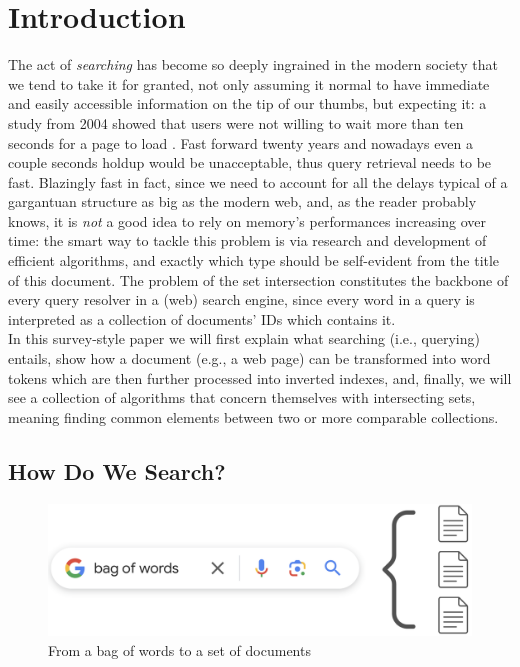 \chapter{Introduction\label{intro}}

The act of \textit{searching} has become so deeply ingrained in the modern society that we tend to take it for granted, not only assuming it normal to have immediate and easily accessible information on the tip of our thumbs, but expecting it: a study from 2004 showed that users were not willing to wait more than ten seconds for a page to load \citep{waitTime}. Fast forward twenty years and nowadays even a couple seconds holdup would be unacceptable, thus query retrieval needs to be fast. Blazingly fast in fact, since we need to account for all the delays typical of a gargantuan structure as big as the modern web, and, as the reader probably knows, it is \textit{not} a good idea to rely on memory's performances increasing over time: the smart way to tackle this problem is via research and development of efficient algorithms, and exactly which type should be self-evident from the title of this document. The problem of the set intersection constitutes the backbone of every query resolver in a (web) search engine, since every word in a query is interpreted as a collection of documents' IDs which contains it. \\
In this survey-style paper we will first explain what searching (i.e., querying) entails, show how a document (e.g., a web page) can be transformed into word tokens which are then further processed into inverted indexes, and, finally, we will see a collection of algorithms that concern themselves with intersecting sets, meaning finding common elements between two or more comparable collections. 

\section{How Do We Search?}

\begin{figure}[ht] 
\begin{center}
\includegraphics[width=.8\textwidth]{imgs/query_bagofwords.png}
\caption{From a bag of words to a set of documents\label{fig:bagtodocs}}
\end{center}
\end{figure}


